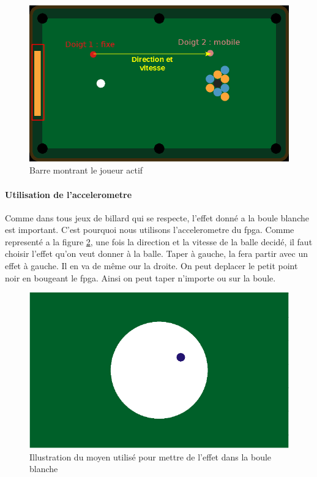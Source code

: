 \begin{figure}[!ht]
\centering
\includegraphics[scale=0.6]{barre.png}
\caption{Barre montrant le joueur actif}
\label{fig6}
\end{figure}

\paragraph{Utilisation de l'accelerometre}

Comme dans tous jeux de billard qui se respecte, l'effet donné a la boule blanche est important. C'est pourquoi nous utilisons l'accelerometre du fpga. Comme representé a la figure \ref{fig7}, une fois la direction et la vitesse de la balle decidé, il faut choisir l'effet qu'on veut donner à la balle. Taper à gauche, la fera partir avec un effet à gauche. Il en va de même our la droite. On peut deplacer le petit point noir en bougeant le fpga. Ainsi on peut taper n'importe ou sur la boule.

\begin{figure}[!ht]
\centering
\includegraphics[scale=0.6]{accel.png}
\caption{Illustration du moyen utilisé pour mettre de l'effet dans la boule blanche}
\label{fig7}
\end{figure}
\newpage
